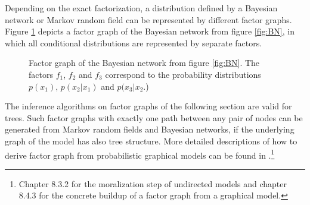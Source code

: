 \documentclass{sigkdd}
\begin{document}
Depending on the exact factorization, a distribution defined by a Bayesian network or Markov random field can be represented by different factor graphs. Figure \ref{fig:FG} depicts a factor graph of the Bayesian network from figure \ref{fig:BN}, in which all conditional distributions are represented by separate factors.

\begin{figure}[h]
	\centering
	\caption{Factor graph of the Bayesian network from figure \ref{fig:BN}. The factors $f_1$, $f_2$ and $f_3$ correspond to the probability distributions $p(x_1)$, $p(x_2|x_1)$ and $p(x_3|x_2$.)}\label{fig:FG}
\end{figure}

The inference algorithms on factor graphs of the following section are valid for trees. Such factor graphs with exactly one path between any pair of nodes can be generated from Markov random fields and Bayesian networks, if the underlying graph of the model has also tree structure. More detailed descriptions of how to derive factor graph from probabilistic graphical models can be found in \cite{bishop2006prml}.\footnote{Chapter 8.3.2 for the moralization step of undirected models and chapter 8.4.3 for the concrete buildup of a factor graph from a graphical model.}
\end{document}
